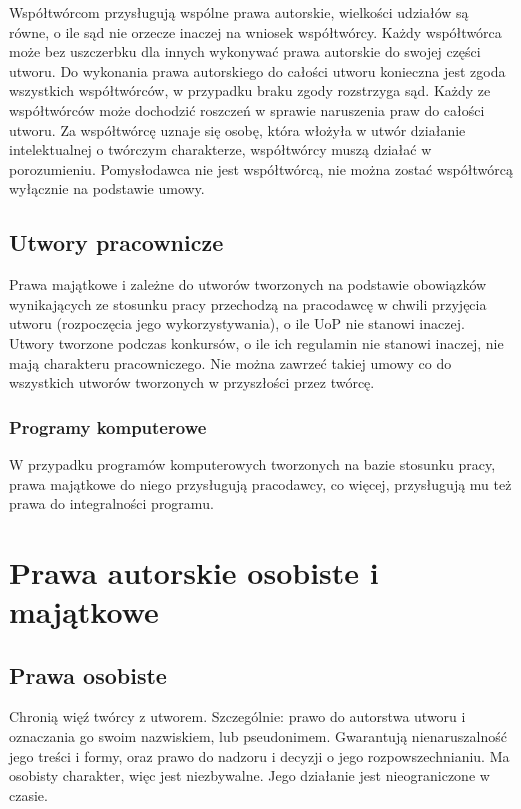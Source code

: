 \documentclass{article}
\begin{document}
Współtwórcom przysługują wspólne prawa autorskie, wielkości udziałów są równe, o ile sąd nie orzecze inaczej na wniosek współtwórcy.
Każdy współtwórca może bez uszczerbku dla innych wykonywać prawa autorskie do swojej części utworu.
Do wykonania prawa autorskiego do całości utworu konieczna jest zgoda wszystkich współtwórców, w przypadku braku zgody rozstrzyga sąd.
Każdy ze współtwórców może dochodzić roszczeń w sprawie naruszenia praw do całości utworu.
Za współtwórcę uznaje się osobę, która włożyła w utwór działanie intelektualnej o twórczym charakterze, współtwórcy muszą działać w porozumieniu.
Pomysłodawca nie jest współtwórcą, nie można zostać współtwórcą wyłącznie na podstawie umowy.

\subsection{Utwory pracownicze}

Prawa majątkowe i zależne do utworów tworzonych na podstawie obowiązków wynikających ze stosunku pracy przechodzą na pracodawcę w chwili przyjęcia utworu (rozpoczęcia jego wykorzystywania), o ile UoP nie stanowi inaczej.
Utwory tworzone podczas konkursów, o ile ich regulamin nie stanowi inaczej, nie mają charakteru pracowniczego.
Nie można zawrzeć takiej umowy co do wszystkich utworów tworzonych w przyszłości przez twórcę.

\subsubsection{Programy komputerowe}

W przypadku programów komputerowych tworzonych na bazie stosunku pracy, prawa majątkowe do niego przysługują pracodawcy, co więcej, przysługują mu też prawa do integralności programu.

\section{Prawa autorskie osobiste i majątkowe}

\subsection{Prawa osobiste}

Chronią więź twórcy z utworem.
Szczególnie: prawo do autorstwa utworu i oznaczania go swoim nazwiskiem, lub pseudonimem.
Gwarantują nienaruszalność jego treści i formy, oraz prawo do nadzoru i decyzji o jego rozpowszechnianiu.
Ma osobisty charakter, więc jest niezbywalne. Jego działanie jest nieograniczone w czasie.
\end{document}
